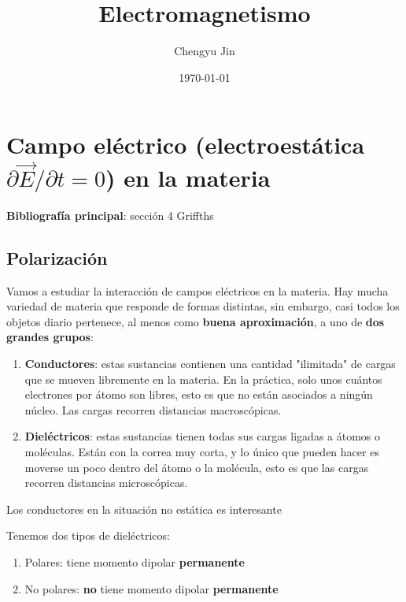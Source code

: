 \documentclass[12pt,a4paper]{report}
\title{Electromagnetismo}
\author{Chengyu Jin}
\date{\today}
\newcommand{\esp}{\vspace{0.5cm}}
\begin{document}
	
	\maketitle
	
	\tableofcontents
	\newpage
	
	\chapter{Campo eléctrico (electroestática $\partial \vec{E}/ \partial t = 0$) en la materia}
	
	\esp
	
	\noindent \textbf{Bibliografía principal}: sección 4 Griffths
	
	\section{Polarización}

	Vamos a estudiar la interacción de campos eléctricos en la materia. Hay mucha variedad de materia que responde de formas distintas, sin embargo, casi todos los objetos diario pertenece, al menos como \textbf{buena aproximación}, a uno de \textbf{dos grandes grupos}:
	
	\begin{enumerate}
		\item \textbf{Conductores}: estas sustancias contienen una cantidad "ilimitada" de cargas que se mueven libremente en la materia. En la práctica, solo unos cuántos electrones por átomo son libres, esto es que no están asociados a ningún núcleo. Las cargas recorren distancias macroscópicas.
		\item \textbf{Dieléctricos}: estas sustancias tienen todas sus cargas ligadas a átomos o moléculas. Están con la correa muy corta, y lo único que pueden hacer es moverse un poco dentro del átomo o la molécula, esto es que las cargas recorren distancias microscópicas.
	\end{enumerate}
	
	\esp
	
	\begin{nota}
		Los conductores en la situación no estática es interesante
	\end{nota}
	
	\esp
	
	\noindent Tenemos dos tipos de dieléctricos:
	
	\begin{enumerate}
		\item Polares: tiene momento dipolar \textbf{permanente}
		\item No polares: \textbf{no} tiene momento dipolar \textbf{permanente}
	\end{enumerate}
\end{document}

